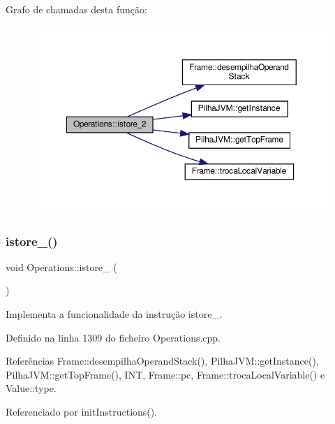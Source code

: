 Grafo de chamadas desta função\+:
\nopagebreak
\begin{figure}[H]
\begin{center}
\leavevmode
\includegraphics[width=350pt]{classOperations_a0fbc901b4c88aef8455b30d9b2063447_cgraph}
\end{center}
\end{figure}
\mbox{\label{classOperations_a3ff20f0475eaaa28501ea330074f5cb7}} 
\subsubsection{\texorpdfstring{istore\+\_()}{istore\_3()}}
{\footnotesize\ttfamily void Operations\+::istore\+\_ (\begin{DoxyParamCaption}{ }\end{DoxyParamCaption})\hspace{0.3cm}{\ttfamily [private]}}



Implementa a funcionalidade da instrução istore\+\_. 



Definido na linha 1309 do ficheiro Operations.\+cpp.



Referências Frame\+::desempilha\+Operand\+Stack(), Pilha\+J\+V\+M\+::get\+Instance(), Pilha\+J\+V\+M\+::get\+Top\+Frame(), I\+NT, Frame\+::pc, Frame\+::troca\+Local\+Variable() e Value\+::type.



Referenciado por init\+Instructions().

